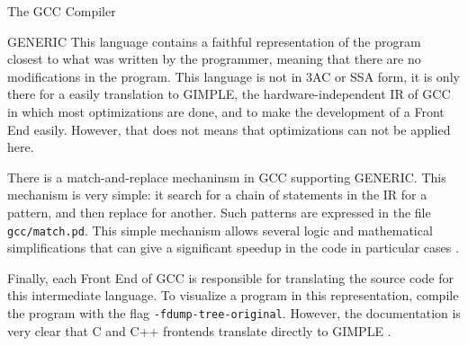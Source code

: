 \begin{section}{The GCC Compiler}
\begin{subsection}{GENERIC}
	This language contains a faithful representation of the program closest to
	what was written by the programmer, meaning that there are no modifications
	in the program. This language is not in 3AC or SSA form, it is only there
	for a easily translation to GIMPLE, the hardware-independent IR of GCC
	in which most optimizations are done, and to make the development of a
	Front End easily. However, that does not means that optimizations can not
	be applied here.

	There is a match-and-replace mechaninsm in GCC supporting GENERIC. This
	mechanism is very simple: it search for a chain of statements in the IR
	for a pattern, and then replace for another. Such patterns are expressed
	in the file \texttt{gcc/match.pd}. This simple mechanism allows several
	logic and mathematical simplifications that can give a significant speedup
	in the code in particular cases \citep{sinatan}.




	Finally, each Front End of GCC is responsible for translating the source
	code for this intermediate language. To visualize a program in this representation,
	compile the program with the flag \texttt{-fdump-tree-original}. However,
	the documentation is very clear that C and C++ frontends translate
	directly to GIMPLE \citep{gimple}.

\end{subsection}


\end{section}
